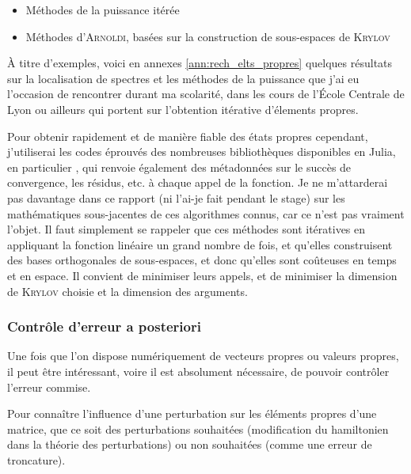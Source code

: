 \documentclass[svgnames,dvipsnames,a4paper,10pt,french]{report}
\begin{document}
\begin{itemize}
    \item Méthodes de la puissance itérée
    \item Méthodes d'\textsc{Arnoldi}, basées sur la construction de sous-espaces de \textsc{Krylov}  %
\end{itemize}

À titre d'exemples, voici en annexes \ref{ann:rech_elts_propres} quelques résultats  sur la localisation de spectres et les méthodes de la puissance que j'ai eu l'occasion de rencontrer durant ma scolarité, dans les cours de l'École Centrale de Lyon ou ailleurs qui portent sur l'obtention itérative d'élements propres.

Pour obtenir rapidement et de manière fiable des états propres cependant, j'utiliserai les codes éprouvés des nombreuses bibliothèques disponibles en Julia, en particulier , qui renvoie également des métadonnées sur le succès de convergence, les résidus, etc. à chaque appel de la fonction. Je ne m'attarderai pas davantage dans ce rapport (ni l'ai-je fait pendant le stage) sur les mathématiques sous-jacentes de ces algorithmes connus, car ce n'est pas vraiment l'objet. Il faut simplement se rappeler que ces méthodes sont itératives en appliquant la fonction linéaire un grand nombre de fois, et qu'elles construisent des bases orthogonales de sous-espaces, et donc qu'elles sont coûteuses en temps et en espace. Il convient de minimiser leurs appels, et de minimiser la dimension de \textsc{Krylov} choisie et la dimension des arguments.




\subsubsection{Contrôle d'erreur a posteriori}



Une fois que l'on dispose numériquement de vecteurs propres ou valeurs propres, il peut être intéressant, voire il est absolument nécessaire, de pouvoir contrôler l'erreur commise. 




Pour connaître l'influence d'une perturbation sur les éléments propres d'une matrice, que ce soit des perturbations souhaitées (modification du hamiltonien dans la théorie des perturbations) ou non souhaitées (comme une erreur de troncature).
\end{document}
